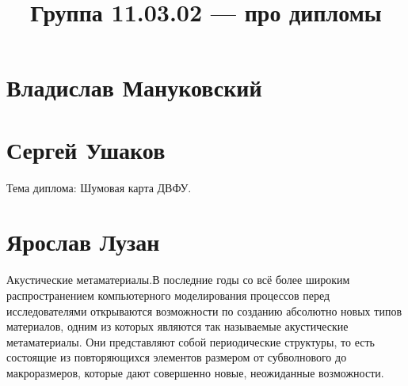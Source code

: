 \documentclass{article}
\title{Группа 11.03.02 --- про дипломы}
\begin{document}
\section*{Владислав Мануковский}

\section*{Сергей Ушаков}
Тема диплома: Шумовая карта ДВФУ.

\section*{Ярослав Лузан}
Акустические метаматериалы.В последние годы со всё более широким распространением компьютерного моделирования процессов перед исследователями открываются возможности по созданию абсолютно новых типов материалов, одним из которых являются так называемые акустические метаматериалы. Они представляют собой периодические структуры, то есть состоящие из повторяющихся элементов размером от субволнового до макроразмеров, которые дают совершенно новые, неожиданные возможности.
\end{document}
